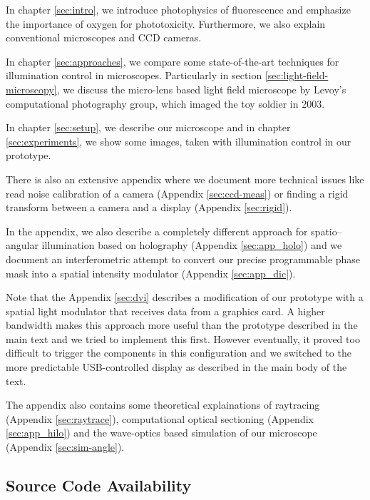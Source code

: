 \documentclass[oneside,a4paper,12pt,BCOR20mm,DIV14]{scrbook}
\begin{document}
In chapter \ref{sec:intro}, we introduce photophysics of fluorescence
and emphasize the importance of oxygen for phototoxicity. Furthermore,
we also explain conventional microscopes and CCD cameras.

In chapter \ref{sec:approaches}, we compare some state-of-the-art
techniques for illumination control in microscopes.  Particularly in
section \ref{sec:light-field-microscopy}, we discuss the micro-lens
based light field microscope by Levoy's computational photography
group, which imaged the toy soldier in 2003.

In chapter \ref{sec:setup}, we describe our microscope and in chapter
\ref{sec:experiments}, we show some images, taken with illumination
control in our prototype.

There is also an extensive appendix where we document more technical
issues like read noise calibration of a camera (Appendix
\ref{sec:ccd-meas}) or finding a rigid transform between a camera and
a display (Appendix \ref{sec:rigid}).

In the appendix, we also describe a completely different approach for
spatio--angular illumination based on holography (Appendix
\ref{sec:app_holo}) and we document an interferometric attempt to
convert our precise programmable phase mask into a spatial intensity
modulator (Appendix \ref{sec:app_dic}).

Note that the Appendix \ref{sec:dvi} describes a modification of our
prototype with a spatial light modulator that receives data from a
graphics card. A higher bandwidth makes this approach more useful than
the prototype described in the main text and we tried to implement
this first. However eventually, it proved too difficult to trigger the
components in this configuration and we switched to the more
predictable USB-controlled display as described in the main body of
the text.
 
The appendix also contains some theoretical explainations of
raytracing (Appendix \ref{sec:raytrace}), computational optical
sectioning (Appendix \ref{sec:app_hilo}) and the wave-optics based
simulation of our microscope (Appendix \ref{sec:sim-angle}).

\subsection*{Source Code Availability}
\end{document}
